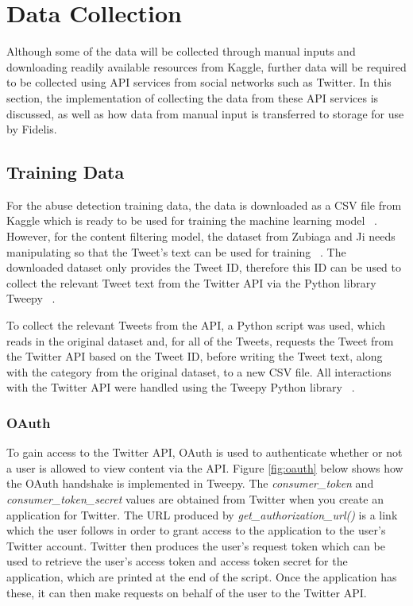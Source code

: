 \section{Data Collection}
Although some of the data will be collected through manual inputs and downloading readily available resources from Kaggle, further data will be required to be collected using API services from social networks such as Twitter. In this section, the implementation of collecting the data from these API services is discussed, as well as how data from manual input is transferred to storage for use by Fidelis.

\subsection{Training Data} \label{sec:training-data}
For the abuse detection training data, the data is downloaded as a CSV file from Kaggle which is ready to be used for training the machine learning model ~\cite{Kaggle:Dataset}. However, for the content filtering model, the dataset from Zubiaga and Ji needs manipulating so that the Tweet's text can be used for training ~\cite{Zubiaga:Tweets}. The downloaded dataset only provides the Tweet ID, therefore this ID can be used to collect the relevant Tweet text from the Twitter API via the Python library Tweepy ~\cite{Tweepy}.

To collect the relevant Tweets from the API, a Python script was used, which reads in the original dataset and, for all of the Tweets, requests the Tweet from the Twitter API based on the Tweet ID, before writing the Tweet text, along with the category from the original dataset, to a new CSV file. All interactions with the Twitter API were handled using the Tweepy Python library ~\cite{Tweepy}. 

\subsubsection{OAuth}
To gain access to the Twitter API, OAuth is used to authenticate whether or not a user is allowed to view content via the API. Figure \ref{fig:oauth} below shows how the OAuth handshake is implemented in Tweepy. The \textit{consumer\_token} and \textit{consumer\_token\_secret} values are obtained from Twitter when you create an application for Twitter. The URL produced by \textit{get\_authorization\_url()} is a link which the user follows in order to grant access to the application to the user's Twitter account. Twitter then produces the user's request token which can be used to retrieve the user's access token and access token secret for the application, which are printed at the end of the script. Once the application has these, it can then make requests on behalf of the user to the Twitter API.

